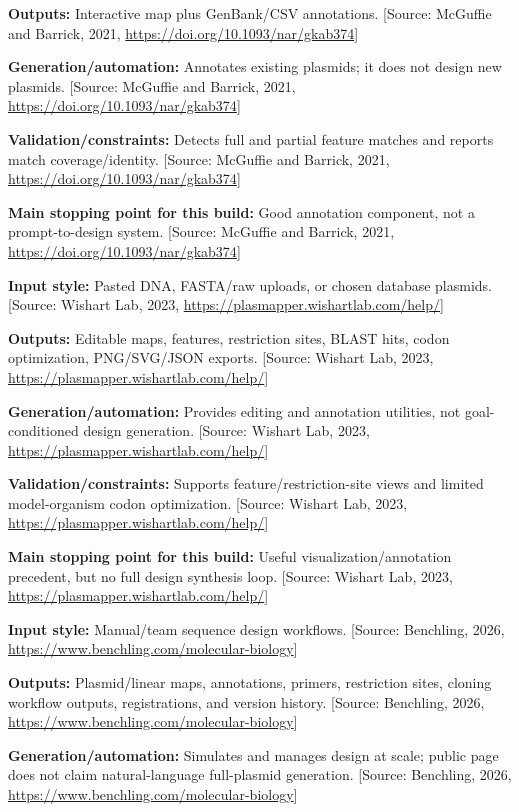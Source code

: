 \documentclass[11pt]{report}
\begin{document}
\begin{description}
\textbf{Outputs:} Interactive map plus GenBank/CSV annotations. [Source: McGuffie and Barrick, 2021, \url{https://doi.org/10.1093/nar/gkab374}]\par
\textbf{Generation/automation:} Annotates existing plasmids; it does not design new plasmids. [Source: McGuffie and Barrick, 2021, \url{https://doi.org/10.1093/nar/gkab374}]\par
\textbf{Validation/constraints:} Detects full and partial feature matches and reports match coverage/identity. [Source: McGuffie and Barrick, 2021, \url{https://doi.org/10.1093/nar/gkab374}]\par
\textbf{Main stopping point for this build:} Good annotation component, not a prompt-to-design system. [Source: McGuffie and Barrick, 2021, \url{https://doi.org/10.1093/nar/gkab374}]\par
\item[PlasMapper 3.0]
\textbf{Input style:} Pasted DNA, FASTA/raw uploads, or chosen database plasmids. [Source: Wishart Lab, 2023, \url{https://plasmapper.wishartlab.com/help/}]\par
\textbf{Outputs:} Editable maps, features, restriction sites, BLAST hits, codon optimization, PNG/SVG/JSON exports. [Source: Wishart Lab, 2023, \url{https://plasmapper.wishartlab.com/help/}]\par
\textbf{Generation/automation:} Provides editing and annotation utilities, not goal-conditioned design generation. [Source: Wishart Lab, 2023, \url{https://plasmapper.wishartlab.com/help/}]\par
\textbf{Validation/constraints:} Supports feature/restriction-site views and limited model-organism codon optimization. [Source: Wishart Lab, 2023, \url{https://plasmapper.wishartlab.com/help/}]\par
\textbf{Main stopping point for this build:} Useful visualization/annotation precedent, but no full design synthesis loop. [Source: Wishart Lab, 2023, \url{https://plasmapper.wishartlab.com/help/}]\par
\item[Benchling]
\textbf{Input style:} Manual/team sequence design workflows. [Source: Benchling, 2026, \url{https://www.benchling.com/molecular-biology}]\par
\textbf{Outputs:} Plasmid/linear maps, annotations, primers, restriction sites, cloning workflow outputs, registrations, and version history. [Source: Benchling, 2026, \url{https://www.benchling.com/molecular-biology}]\par
\textbf{Generation/automation:} Simulates and manages design at scale; public page does not claim natural-language full-plasmid generation. [Source: Benchling, 2026, \url{https://www.benchling.com/molecular-biology}]\par

\end{description}
\end{document}
